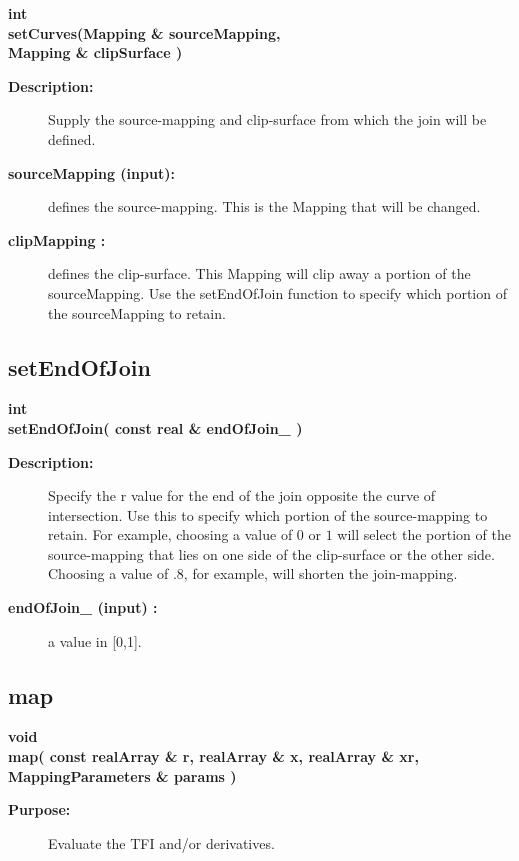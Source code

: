 \begin{flushleft} \textbf{%
int  \\ 
\settowidth{\JoinMappingIncludeArgIndent}{setCurves(}%
setCurves(Mapping \& sourceMapping, \\ 
\hspace{\JoinMappingIncludeArgIndent}Mapping \& clipSurface )
}\end{flushleft}
\begin{description}
\item[{\bf Description:}]  
   Supply the source-mapping and clip-surface from which the join will be defined.
 
\item[{\bf sourceMapping (input):}]  defines the source-mapping. This is the Mapping
  that will be changed. 
\item[{\bf clipMapping :}]  defines the clip-surface. This Mapping will clip away a
    portion of the sourceMapping. Use  the setEndOfJoin function to specify
    which portion of the sourceMapping to retain. 
\end{description}
\subsection{setEndOfJoin}
 
\begin{flushleft} \textbf{%
int  \\ 
\settowidth{\JoinMappingIncludeArgIndent}{setEndOfJoin(}%
setEndOfJoin( const real \& endOfJoin\_ )
}\end{flushleft}
\begin{description}
\item[{\bf Description:}]  
 Specify the r value for the end of the join opposite the curve
 of intersection. Use this to specify which portion of the source-mapping to retain.
 For example, choosing a value of $0$ or $1$ will select the portion of the
 source-mapping that lies on one side of the clip-surface or the other side. Choosing
 a value of $.8$, for example, will shorten the join-mapping. 
 
\item[{\bf endOfJoin\_ (input) :}]  a value in [0,1].
\end{description}
\subsection{map}
 
\begin{flushleft} \textbf{%
void  \\ 
\settowidth{\JoinMappingIncludeArgIndent}{map(}%
map( const realArray \& r, realArray \& x, realArray \& xr, MappingParameters \& params )
}\end{flushleft}
\begin{description}
\item[{\bf Purpose:}]  Evaluate the TFI and/or derivatives. 
\end{description}

